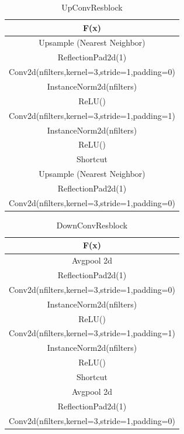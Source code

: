 \begin{table}[ht]
\caption{UpConvResblock} %
\centering %
\begin{tabular}{c} %
\hline\hline %
F(x)\\%
\hline
Upsample (Nearest Neighbor) \\
ReflectionPad2d(1) \\
Conv2d(nfilters,kernel=3,stride=1,padding=0) \\
InstanceNorm2d(nfilters)\\ %
ReLU() \\
Conv2d(nfilters,kernel=3,stride=1,padding=1) \\
InstanceNorm2d(nfilters)\\ %
ReLU() \\
\hline %
Shortcut\\
\hline 
Upsample (Nearest Neighbor) \\
ReflectionPad2d(1)\\
Conv2d(nfilters,kernel=3,stride=1,padding=0) \\
\hline
\end{tabular}
\label{table:upconvresblock} %
\end{table}

\begin{table}[ht]
\caption{DownConvResblock} %
\centering %
\begin{tabular}{c} %
\hline\hline %
F(x)\\%
\hline
Avgpool 2d \\
ReflectionPad2d(1) \\
Conv2d(nfilters,kernel=3,stride=1,padding=0) \\
InstanceNorm2d(nfilters)\\ %
ReLU() \\
Conv2d(nfilters,kernel=3,stride=1,padding=1) \\
InstanceNorm2d(nfilters)\\ %
ReLU() \\
\hline %
Shortcut\\
\hline 
Avgpool 2d \\
ReflectionPad2d(1)\\
Conv2d(nfilters,kernel=3,stride=1,padding=0) \\
\hline
\end{tabular}
\label{table:downconvresblock} %
\end{table}


